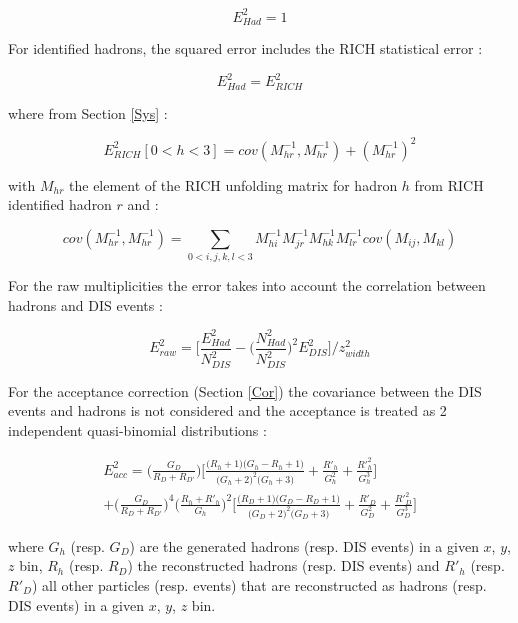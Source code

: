 \documentclass[letterpaper,12pt]{article}
\begin{document}
\begin{equation}
		E^2_{Had} = 1
\end{equation}

For identified hadrons, the squared error includes the RICH statistical error :

\begin{equation}
		E^2_{Had} = E^2_{RICH}
\end{equation}

where from Section \ref{Sys} :

\begin{equation}
		E^2_{RICH}[0<h<3] = cov(M^{-1}_{hr},M^{-1}_{hr})+(M^{-1}_{hr})^2
\end{equation}

with $M_{hr}$ the element of the RICH unfolding matrix for hadron $h$ from RICH identified hadron $r$ and :

\begin{equation}
		cov(M^{-1}_{hr},M^{-1}_{hr}) = \sum_{0<i,j,k,l<3} M^{-1}_{hi}M^{-1}_{jr}M^{-1}_{hk}M^{-1}_{lr}cov(M_{ij},M_{kl})
\end{equation}

For the raw multiplicities the error takes into account the correlation between hadrons and DIS events :

\begin{equation}
		E^2_{raw} = \Bigg[\frac{E^2_{Had}}{N^2_{DIS}} - \bigg( \frac{N^2_{Had}}{N^2_{DIS}} \bigg)^2 E^2_{DIS} \Bigg]/z^2_{width}
\end{equation}

For the acceptance correction (Section \ref{Cor}) the covariance between the DIS events and hadrons is not considered and the acceptance is treated as 2 independent quasi-binomial distributions :

\begin{equation}
\begin{split}
		E^2_{acc} = \bigg(\frac{G_D}{R_D+R_{D'}}\bigg) \bigg[ \frac{\big( R_h+1 \big)\big( G_h-R_h+1 \big)}{\big( G_h+2 \big)^2\big( G_h+3 \big)}+\frac{R'_h}{G^2_h}+\frac{R'^2_h}{G^3_h} \bigg] \\
		+ \bigg(\frac{G_D}{R_D+R_{D'}}\bigg)^4 \bigg(\frac{R_h+R'_h}{G_h}\bigg)^2 \bigg[ \frac{\big( R_D+1 \big)\big( G_D-R_D+1 \big)}{\big( G_D+2 \big)^2\big( G_D+3 \big)}+\frac{R'_D}{G^2_D}+\frac{R'^2_D}{G^3_D} \bigg]
\end{split}
\end{equation}

where $G_h$ (resp. $G_D$) are the generated hadrons (resp. DIS events) in a given $x$, $y$, $z$ bin, $R_h$ (resp. $R_D$) the reconstructed hadrons (resp. DIS events) and $R'_h$ (resp. $R'_D$) all other particles (resp. events) that are reconstructed as hadrons (resp. DIS events) in a given $x$, $y$, $z$ bin.
\end{document}
